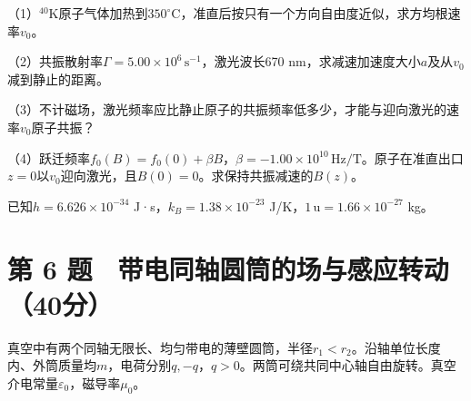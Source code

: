 \documentclass[12pt,a4paper,fontset=fandol]{ctexart}
\begin{document}
\begin{center}
\begin{minipage}{\linewidth}
\centering\begingroup{}
\ifdim\wd\diagrambox>.88\linewidth
\sbox{\diagrambox}{\resizebox{.88\linewidth}{!}{\usebox{\diagrambox}}}\fi
\ifdim\ht\diagrambox>.20\textheight
\resizebox{!}{.20\textheight}{\usebox{\diagrambox}}
\else\usebox{\diagrambox}\fi
\par{}\endgroup\end{minipage}\end{center}

（1）\(^{40}\mathrm K\)原子气体加热到\(350^\circ\)C，准直后按只有一个方向自由度近似，求方均根速率\(v_0\)。

（2）共振散射率\(\Gamma=5.00\times10^6\,\mathrm{s^{-1}}\)，激光波长670
nm，求减速加速度大小\(a\)及从\(v_0\)减到静止的距离。

（3）不计磁场，激光频率应比静止原子的共振频率低多少，才能与迎向激光的速率\(v_0\)原子共振？

（4）跃迁频率\(f_0(B)=f_0(0)+\beta B\)，\(\beta=-1.00\times10^{10}\,\mathrm{Hz/T}\)。原子在准直出口\(z=0\)以\(v_0\)迎向激光，且\(B(0)=0\)。求保持共振减速的\(B(z)\)。

已知\(h=6.626\times10^{-34}\) J·s，\(k_B=1.38\times10^{-23}\)
J/K，\(1\,\mathrm u=1.66\times10^{-27}\) kg。

\clearpage

\section{第 6
题　带电同轴圆筒的场与感应转动（40分）}\label{ux7b2c-6-ux9898-ux5e26ux7535ux540cux8f74ux5706ux7b52ux7684ux573aux4e0eux611fux5e94ux8f6cux52a840ux5206}

真空中有两个同轴无限长、均匀带电的薄壁圆筒，半径\(r_1<r_2\)。沿轴单位长度内、外筒质量均\(m\)，电荷分别\(q,-q\)，\(q>0\)。两筒可绕共同中心轴自由旋转。真空介电常量\(\varepsilon_0\)，磁导率\(\mu_0\)。
\end{document}
